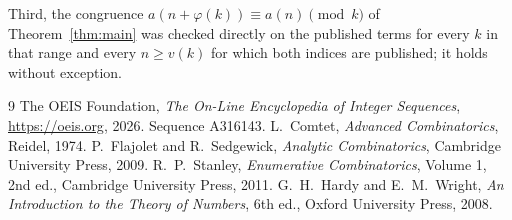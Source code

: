 \documentclass[11pt,a4paper]{article}
\theoremstyle{plain}
\theoremstyle{definition}
\begin{document}
Third, the congruence $a(n+\varphi(k))\equiv a(n)\pmod k$ of Theorem~\ref{thm:main} was
checked directly on the published terms for every $k$ in that range and every $n\ge v(k)$
for which both indices are published; it holds without exception.

\begin{thebibliography}{9}
 The OEIS Foundation, \emph{The On-Line Encyclopedia of Integer
Sequences}, \url{https://oeis.org}, 2026. Sequence A316143.
 L.~Comtet, \emph{Advanced Combinatorics}, Reidel, 1974.
 P.~Flajolet and R.~Sedgewick, \emph{Analytic Combinatorics}, Cambridge
University Press, 2009.
 R.~P.~Stanley, \emph{Enumerative Combinatorics}, Volume 1, 2nd ed.,
Cambridge University Press, 2011.
 G.~H.~Hardy and E.~M.~Wright, \emph{An Introduction to the Theory of
Numbers}, 6th ed., Oxford University Press, 2008.
\end{thebibliography}
\end{document}
